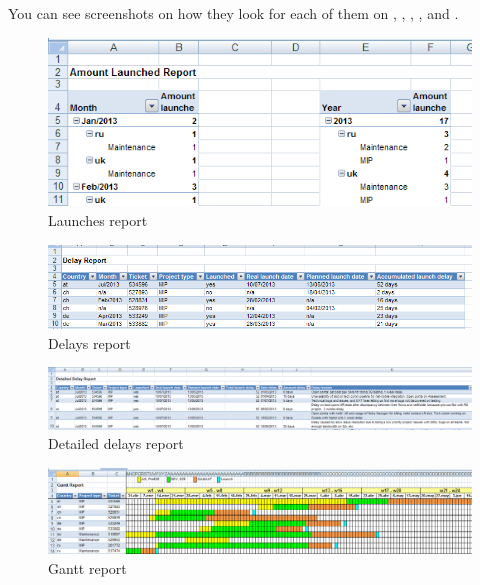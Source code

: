 You can see screenshots on how they look for each of them on
, ,
, ,
 and .

\begin{figure}[ht!]
	\centering
   	\includegraphics[width=1\textwidth]{./resources/report_launches.png}
   	\caption{Launches report}
   	\label{f_report_launches}
\end{figure}
\begin{figure}[ht!]
	\centering
   	\includegraphics[width=1\textwidth]{./resources/report_delays.png}
   	\caption{Delays report}
   	\label{f_report_delays}
\end{figure}
\begin{figure}[ht!]
	\centering
   	\includegraphics[width=1\textwidth]{./resources/report_delays_detail.png}
   	\caption{Detailed delays report}
   	\label{f_report_delays_detail}
\end{figure}
\begin{figure}[ht!]
	\centering
   	\includegraphics[width=1\textwidth]{./resources/report_gantt.png}
   	\caption{Gantt report}
   	\label{f_report_gantt}
\end{figure}
